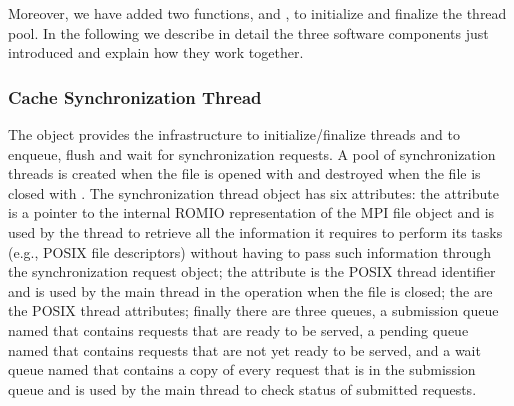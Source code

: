 Moreover, we have added two functions,  and , to initialize and finalize the thread pool.
In the following we describe in detail the three software components just introduced and explain how they work together.

\subsubsection{Cache Synchronization Thread}
The  object provides the infrastructure to initialize/finalize threads and to enqueue, flush and wait for synchronization requests. A pool of synchronization threads 
is created when the file is opened with  and destroyed when the file is closed with . The synchronization thread object has six attributes: 
the  attribute is a pointer to the internal ROMIO representation of the MPI file object and is used by the thread to retrieve all the information it requires to perform its tasks 
(e.g., POSIX file descriptors) without having to pass such information through the synchronization request object; the  attribute is the POSIX thread identifier and is used by the 
main thread in the  operation when the file is closed; the  are the POSIX thread attributes; finally there are three queues, a submission queue named 
 that contains requests that are ready to be served, a pending queue named  that contains requests that are not yet ready to be served, and a wait queue named 
 that contains a copy of every request that is in the submission queue and is used by the main thread to check status of submitted requests.

%
%
%

